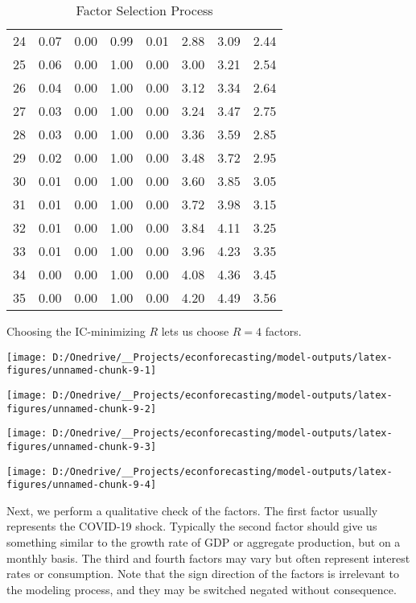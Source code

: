 \documentclass[11pt, letterpaper]{article}\usepackage[]{graphicx}\usepackage[]{color}
\begin{document}
\begin{table}[H]
\begin{tabular}{cccccccc}
   24 & 0.07 & 0.00 & 0.99 & 0.01 & 2.88 & 3.09 & 2.44 \\ 
   25 & 0.06 & 0.00 & 1.00 & 0.00 & 3.00 & 3.21 & 2.54 \\ 
   26 & 0.04 & 0.00 & 1.00 & 0.00 & 3.12 & 3.34 & 2.64 \\ 
   27 & 0.03 & 0.00 & 1.00 & 0.00 & 3.24 & 3.47 & 2.75 \\ 
   28 & 0.03 & 0.00 & 1.00 & 0.00 & 3.36 & 3.59 & 2.85 \\ 
   29 & 0.02 & 0.00 & 1.00 & 0.00 & 3.48 & 3.72 & 2.95 \\ 
   30 & 0.01 & 0.00 & 1.00 & 0.00 & 3.60 & 3.85 & 3.05 \\ 
   31 & 0.01 & 0.00 & 1.00 & 0.00 & 3.72 & 3.98 & 3.15 \\ 
   32 & 0.01 & 0.00 & 1.00 & 0.00 & 3.84 & 4.11 & 3.25 \\ 
   33 & 0.01 & 0.00 & 1.00 & 0.00 & 3.96 & 4.23 & 3.35 \\ 
   34 & 0.00 & 0.00 & 1.00 & 0.00 & 4.08 & 4.36 & 3.45 \\ 
   35 & 0.00 & 0.00 & 1.00 & 0.00 & 4.20 & 4.49 & 3.56 \\ 
   \hline
\end{tabular}
\endgroup
\caption{Factor Selection Process} 
\end{table}


Choosing the IC-minimizing $R$ lets us choose $R = 4$ factors.



{\centering \texttt{[image: D:/Onedrive/\_\_Projects/econforecasting/model-outputs/latex-figures/unnamed-chunk-9-1]} 

}




{\centering \texttt{[image: D:/Onedrive/\_\_Projects/econforecasting/model-outputs/latex-figures/unnamed-chunk-9-2]} 

}




{\centering \texttt{[image: D:/Onedrive/\_\_Projects/econforecasting/model-outputs/latex-figures/unnamed-chunk-9-3]} 

}




{\centering \texttt{[image: D:/Onedrive/\_\_Projects/econforecasting/model-outputs/latex-figures/unnamed-chunk-9-4]} 

}




Next, we perform a qualitative check of the factors. The first factor usually represents the COVID-19 shock. Typically the second factor should give us something similar to the growth rate of GDP or aggregate production, but on a monthly basis. The third and fourth factors may vary but often represent interest rates or consumption. Note that the sign direction of the factors is irrelevant to the modeling process, and they may be switched negated without consequence. 
\end{document}
